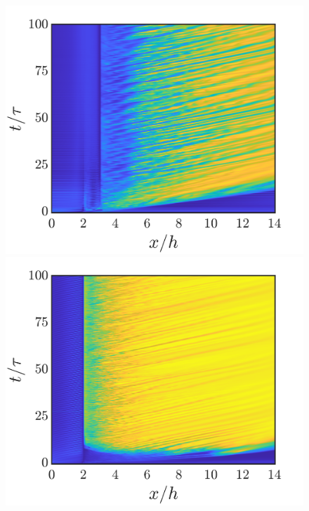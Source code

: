 \documentclass[reprint,a4paper,fleqn]{cas-dc} %
\begin{document}
\begin{figure}[t]
\begin{minipage}[c]{0.24\linewidth}
				\includegraphics[width=1\linewidth,trim={1.6cm 2cm 2cm 1cm},clip]{Figures/MI_HL/spcaeTime_M_2b.png}
				\includegraphics[width=1\linewidth,trim={1.6cm 2cm 2cm 1cm},clip]{Figures/MI_HL/spcaeTime_M_0b.png}
			\end{minipage}
			\begin{minipage}[c]{0.24\linewidth}

\end{minipage}
\end{figure}
\end{document}
